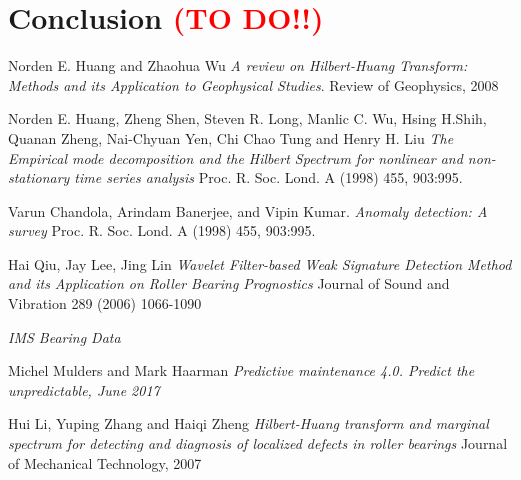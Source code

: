 \documentclass[11pt, oneside]{article}   	%
\begin{document}
\section{Conclusion   \textcolor{red}{(TO DO!!)}}
\begin{thebibliography}{9}
Norden E. Huang and Zhaohua Wu 
\textit{A review on Hilbert-Huang Transform: Methods and its Application to Geophysical Studies}. 
Review of Geophysics, 2008
 
Norden E. Huang, Zheng Shen, Steven R. Long, Manlic C. Wu, Hsing H.Shih, Quanan Zheng, Nai-Chyuan Yen, Chi Chao Tung and Henry H. Liu
\textit{The Empirical mode decomposition and the Hilbert Spectrum for nonlinear and non-stationary time series analysis}
Proc. R. Soc. Lond. A (1998) 455, 903:995.

Varun Chandola, Arindam Banerjee, and Vipin Kumar.
\textit{Anomaly detection: A survey}
Proc. R. Soc. Lond. A (1998) 455, 903:995.

Hai Qiu, Jay Lee, Jing Lin
\textit{Wavelet Filter-based Weak Signature Detection Method and its Application on Roller Bearing Prognostics}
Journal of Sound and Vibration 289 (2006) 1066-1090

\textit{IMS Bearing Data}



 
Michel Mulders and Mark Haarman
\textit{Predictive maintenance 4.0. Predict the unpredictable, June 2017}

 
Hui Li, Yuping Zhang and Haiqi Zheng
\textit{Hilbert-Huang transform and marginal spectrum for detecting and diagnosis of localized defects in roller bearings}
Journal of Mechanical Technology, 2007
\end{thebibliography}
\end{document}
